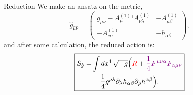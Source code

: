 \documentclass{beamer}
\begin{document}
\begin{frame}{Reduction}
    We make an ansatz on the metric,
    \begin{equation*}
         \hat g_{\hat \mu \hat \nu} = \begin{pmatrix}
        g_{\mu \nu} - A^{(1)\gamma}_{\mu}A^{(1)}_{\nu \lambda} & - A^{(1)}_{\mu \beta} \\  -A^{(1)}_{\nu \alpha} &-h_{\alpha \beta} \end{pmatrix},
    \end{equation*}\pause
    and after some calculation, the reduced action is:
   \begin{equation*}
    \boxed{
    \begin{aligned}
    S_{\hat g} = &\int d x^4\, \sqrt{-g}\Big( \textcolor{red}{R}
    +\textcolor{violet}{\frac{1}{4}F^{\mu \nu \alpha}F_{ \alpha \mu  \nu}}\\
    &-   \frac{1}{4} g^{\rho \lambda} \partial_\lambda h_{\alpha \beta}\partial_\rho h^{\alpha \beta}\Big).
\end{aligned}}
\end{equation*}
\centering{ \textcolor{red}{Low dimension gravity},  \textcolor{violet}{$E$ electromagnetism field}}
\end{frame}
\end{document}
